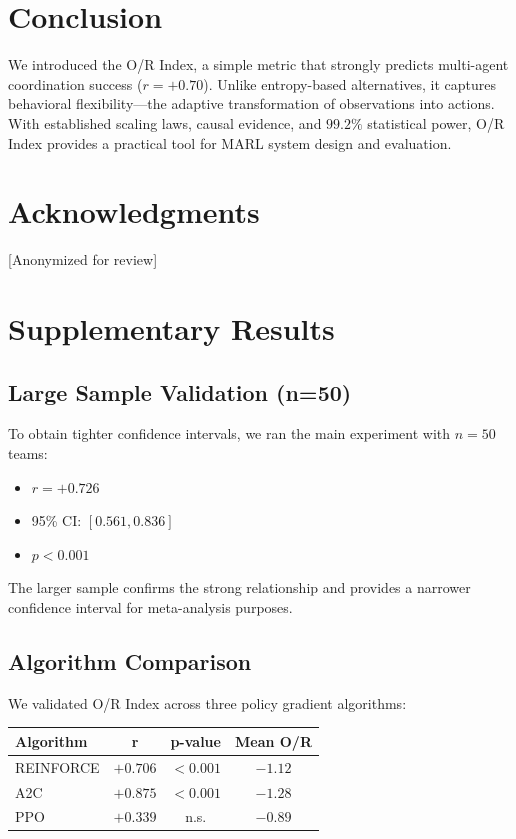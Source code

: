 \documentclass[twoside]{article}
\newcommand{\ORIndex}{O/R Index}
\begin{document}
\section{Conclusion}

We introduced the \ORIndex{}, a simple metric that strongly predicts multi-agent coordination success ($r = +0.70$). Unlike entropy-based alternatives, it captures behavioral flexibility—the adaptive transformation of observations into actions. With established scaling laws, causal evidence, and $99.2\%$ statistical power, \ORIndex{} provides a practical tool for MARL system design and evaluation.

\section*{Acknowledgments}

[Anonymized for review]




\newpage
\appendix

\section{Supplementary Results}

\subsection{Large Sample Validation (n=50)}

To obtain tighter confidence intervals, we ran the main experiment with $n = 50$ teams:
\begin{itemize}
    \item $r = +0.726$
    \item 95\% CI: $[0.561, 0.836]$
    \item $p < 0.001$
\end{itemize}

The larger sample confirms the strong relationship and provides a narrower confidence interval for meta-analysis purposes.

\subsection{Algorithm Comparison}

We validated O/R Index across three policy gradient algorithms:

\begin{center}
\begin{tabular}{lccc}
\toprule
\textbf{Algorithm} & \textbf{r} & \textbf{p-value} & \textbf{Mean O/R} \\
\midrule
REINFORCE & $+0.706$ & $< 0.001$ & $-1.12$ \\
A2C & $+0.875$ & $< 0.001$ & $-1.28$ \\
PPO & $+0.339$ & n.s. & $-0.89$ \\
\bottomrule
\end{tabular}
\end{center}
\end{document}
